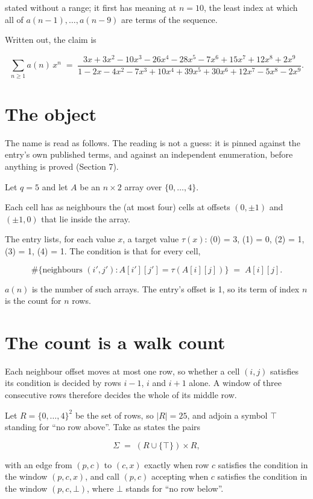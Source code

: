 \documentclass[11pt]{article}
\theoremstyle{definition}
\begin{document}
stated without a range; it first has meaning at $n = 10$, the least index at which all of $a(n-1),\dots,a(n-9)$ are terms of the sequence.

Written out, the claim is

\[\sum_{n \ge 1} a(n)\,x^n \;=\; \frac{3x + 3x^{2} - 10x^{3} - 26x^{4} - 28x^{5} - 7x^{6} + 15x^{7} + 12x^{8} + 2x^{9}}{1 - 2x - 4x^{2} - 7x^{3} + 10x^{4} + 39x^{5} + 30x^{6} + 12x^{7} - 5x^{8} - 2x^{9}}.\]

\section{The object}

The name is read as follows. The reading is not a guess: it is pinned against the entry's own published terms, and against an independent enumeration, before anything is proved (Section 7).

Let $q = 5$ and let $A$ be an $n \times 2$ array over $\{0,\dots,4\}$.

Each cell has as neighbours the (at most four) cells at offsets $(0,\pm1)$ and $(\pm1,0)$ that lie inside the array.

The entry lists, for each value $x$, a target value $\tau(x)$: \tau(0) = 3, \tau(1) = 0, \tau(2) = 1, \tau(3) = 1, \tau(4) = 1. The condition is that for every cell,

\[\#\{\text{neighbours } (i',j') : A[i'][j'] = \tau(A[i][j])\} \;=\; A[i][j].\]

$a(n)$ is the number of such arrays. The entry's offset is 1, so its term of index $n$ is the count for $n$ rows.

\section{The count is a walk count}

Each neighbour offset moves at most one row, so whether a cell $(i,j)$ satisfies its condition is decided by rows $i-1$, $i$ and $i+1$ alone. A window of three consecutive rows therefore decides the whole of its middle row.

Let $R = \{0,\dots,4\}^{2}$ be the set of rows, so $|R| = 25$, and adjoin a symbol $\top$ standing for ``no row above''. Take as states the pairs

\[\Sigma \;=\; (R \cup \{\top\}) \times R,\]

with an edge from $(p,c)$ to $(c,x)$ exactly when row $c$ satisfies the condition in the window $(p,c,x)$, and call $(p,c)$ accepting when $c$ satisfies the condition in the window $(p,c,\bot)$, where $\bot$ stands for ``no row below''.
\end{document}
